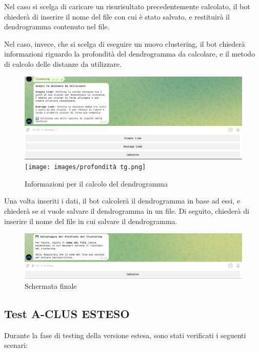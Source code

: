 Nel caso si scelga di caricare un risurisultato  precedentemente calcolato, il bot chiederà di inserire il nome del file con cui è stato salvato, e restituirà il dendrogramma contenuto nel file. 

Nel caso, invece, che si scelga di eseguire un nuovo clustering, il bot chiederà informazioni  riguardo la profondità del dendrogramma da calcolare, e il metodo di calcolo delle distanze da utilizzare.

\begin{figure}[h!]
    \centering
    \includegraphics[width=.5\textwidth]{images/distanza da calcaolare tg.png}
    \texttt{[image: images/profondità tg.png]}
    \caption{Informazioni per il calcolo del dendrogramma}

\end{figure}

Una volta inseriti i dati, il bot calcolerà il dendrogramma in base ad essi, e chiederà se si vuole salvare il dendrogramma in un file. Di seguito, chiederà di inserire il nome del file in cui salvare il dendrogramma.


\begin{figure}[h!]
    \centering
    \includegraphics[width=.5\textwidth]{images/finale tg.png}
    \caption{Schermata finale}
\end{figure}


\subsection{Test A-CLUS ESTESO}

Durante la fase di testing della versione estesa, sono stati verificati i seguenti scenari:

